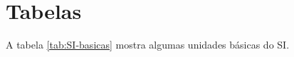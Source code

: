 \chapter{Tabelas}

\thispagestyle{empty} 

A tabela \ref{tab:SI-basicas} mostra algumas unidades básicas do SI.

